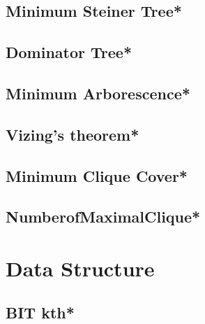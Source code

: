 \subsection{Minimum Steiner Tree*} %

\subsection{Dominator Tree*} %

\subsection{Minimum Arborescence*} %

\subsection{Vizing's theorem*} %
 
\subsection{Minimum Clique Cover*} %

\subsection{NumberofMaximalClique*} %



\section{Data Structure}
% 
\subsection{BIT kth*} %

